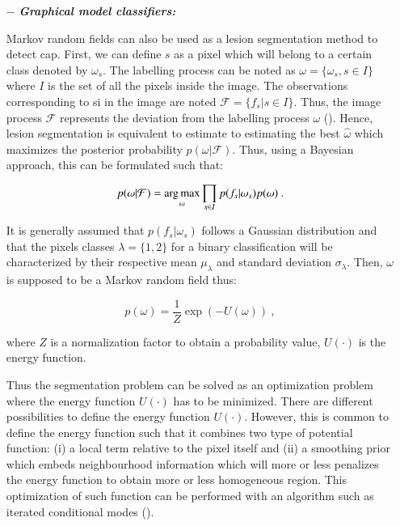 \begin{enumerate}[leftmargin=*]
\item[$-$] \textbf{\textit{Graphical model classifiers:}}

Markov random fields can also be used as a lesion segmentation method to detect \ac{cap}. First, we can define $s$ as a pixel which will belong to a certain class denoted by $\omega_s$. The labelling process can be noted as $\omega = \{\omega_s, s \in I\}$ where $I$ is the set of all the pixels inside the image. The observations corresponding to \ac{si} in the image are noted $\mathcal{F} = \{ f_s | s \in I \}$. Thus, the image process $\mathcal{F}$ represents the deviation from the labelling process $\omega$ (\cite{Kato2001}). Hence, lesion segmentation is equivalent to estimate to estimating the best $\hat{\omega}$ which maximizes the posterior probability $p(\omega|\mathcal{F})$. Thus, using a Bayesian approach, this can be formulated such that:

\begin{equation}
	p(\omega|\mathcal{F}) = \operatorname*{arg\,max}_{\omega} \prod_{s \in I} p(f_s | \omega_s) p(\omega) \ .
	\label{eq:mrf1}
\end{equation}

It is generally assumed that $p(f_s | \omega_s)$ follows a Gaussian distribution and that the pixels classes $\lambda = \{1,2\}$ for a binary classification will be characterized by their respective mean $\mu_{\lambda}$ and standard deviation $\sigma_{\lambda}$. Then, $\omega$ is supposed to be a Markov random field thus:

\begin{equation}
	p(\omega) =  \frac{1}{Z} \exp\left( -U(\omega) \right)  \ ,
	\label{eq:mrf2}
\end{equation}

\noindent where $Z$ is a normalization factor to obtain a probability value, $U(\cdot)$ is the energy function.

Thus the segmentation problem can be solved as an optimization problem where the energy function $U(\cdot)$ has to be minimized. There are different possibilities to define the energy function $U(\cdot)$. However, this is common to define the energy function such that it combines two type of potential function: (i) a local term relative to the pixel itself and (ii) a smoothing prior which embeds neighbourhood information which will more or less penalizes the energy function to obtain more or less homogeneous region. This optimization of such function can be performed with an algorithm such as iterated conditional modes (\cite{Kato2001}).


\end{enumerate}
